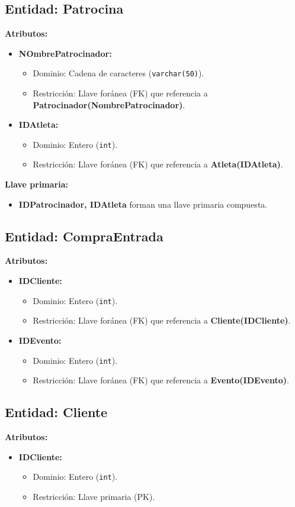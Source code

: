 \subsection*{Entidad: Patrocina}
\textbf{Atributos:}
\begin{itemize}
    \item \textbf{NOmbrePatrocinador:}
    \begin{itemize}
        \item Dominio: Cadena de caracteres (\texttt{varchar(50)}).
        \item Restricción: Llave foránea (FK) que referencia a \textbf{Patrocinador(NombrePatrocinador)}.
    \end{itemize}
    \item \textbf{IDAtleta:}
    \begin{itemize}
        \item Dominio: Entero (\texttt{int}).
        \item Restricción: Llave foránea (FK) que referencia a \textbf{Atleta(IDAtleta)}.
    \end{itemize}
\end{itemize}
\textbf{Llave primaria:}
\begin{itemize}
    \item \textbf{IDPatrocinador, IDAtleta} forman una llave primaria compuesta.
\end{itemize}

\subsection*{Entidad: CompraEntrada}
\textbf{Atributos:}
\begin{itemize}
    \item \textbf{IDCliente:}
    \begin{itemize}
        \item Dominio: Entero (\texttt{int}).
        \item Restricción: Llave foránea (FK) que referencia a \textbf{Cliente(IDCliente)}.
    \end{itemize}
    \item \textbf{IDEvento:}
    \begin{itemize}
        \item Dominio: Entero (\texttt{int}).
        \item Restricción: Llave foránea (FK) que referencia a \textbf{Evento(IDEvento)}.
    \end{itemize}
\end{itemize}

\subsection*{Entidad: Cliente}
\textbf{Atributos:}
\begin{itemize}
    \item \textbf{IDCliente:}
    \begin{itemize}
        \item Dominio: Entero (\texttt{int}).
        \item Restricción: Llave primaria (PK).
    \end{itemize}
    \end{itemize}



